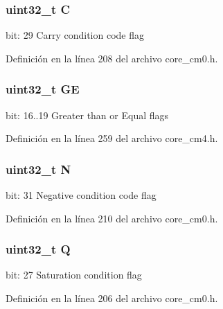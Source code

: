 \subsubsection[{\texorpdfstring{C}{C}}]{\setlength{\rightskip}{0pt plus 5cm}uint32\+\_\+t C}\hypertarget{union_a_p_s_r___type_a7a1caf92f32fe9ebd8d1fe89b06c7776}{}\label{union_a_p_s_r___type_a7a1caf92f32fe9ebd8d1fe89b06c7776}
bit\+: 29 Carry condition code flag 

Definición en la línea 208 del archivo core\+\_\+cm0.\+h.

\subsubsection[{\texorpdfstring{GE}{GE}}]{\setlength{\rightskip}{0pt plus 5cm}uint32\+\_\+t GE}\hypertarget{union_a_p_s_r___type_aa91800ec6e90e457c7a1acd1f2e17099}{}\label{union_a_p_s_r___type_aa91800ec6e90e457c7a1acd1f2e17099}
bit\+: 16..19 Greater than or Equal flags 

Definición en la línea 259 del archivo core\+\_\+cm4.\+h.

\subsubsection[{\texorpdfstring{N}{N}}]{\setlength{\rightskip}{0pt plus 5cm}uint32\+\_\+t N}\hypertarget{union_a_p_s_r___type_abae0610bc2a97bbf7f689e953e0b451f}{}\label{union_a_p_s_r___type_abae0610bc2a97bbf7f689e953e0b451f}
bit\+: 31 Negative condition code flag 

Definición en la línea 210 del archivo core\+\_\+cm0.\+h.

\subsubsection[{\texorpdfstring{Q}{Q}}]{\setlength{\rightskip}{0pt plus 5cm}uint32\+\_\+t Q}\hypertarget{union_a_p_s_r___type_a65f27ddc4f7e09c14ce7c5211b2e000a}{}\label{union_a_p_s_r___type_a65f27ddc4f7e09c14ce7c5211b2e000a}
bit\+: 27 Saturation condition flag 

Definición en la línea 206 del archivo core\+\_\+cm0.\+h.

